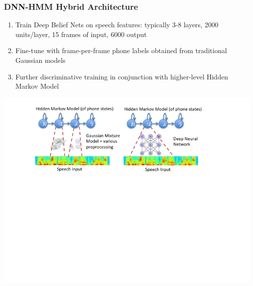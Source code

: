 \documentclass{beamer}
\newcommand{\be}{\begin{enumerate}}
\newcommand{\ee}{\end{enumerate}}
\begin{document}
\begin{frame}
\frametitle{DNN-HMM Hybrid Architecture}
\be
\item Train Deep Belief Nets on speech features: typically 3-8 layers, 2000 units/layer, 15 frames of input, 6000 output
\item Fine-tune with frame-per-frame phone labels obtained from traditional Gaussian models
\item Further discriminative training in conjunction with higher-level Hidden Markov Model
\ee
\centerline{\includegraphics[scale=0.6]{figs/ASR}}
\end{frame}
\end{document}
